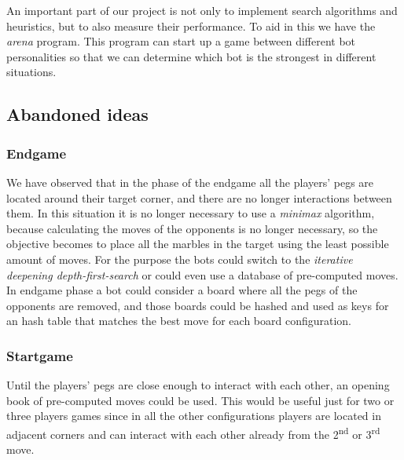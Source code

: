 \documentclass[a4paper,11pt]{article}
\begin{document}
An important part of our project is not only to implement search
algorithms and heuristics, but to also measure their performance. To
aid in this we have the \emph{arena} program. This program can start
up a game between different bot personalities so that we can determine
which bot is the strongest in different situations.



\subsection{Abandoned ideas}

\subsubsection{Endgame}
We have observed that in the phase of the endgame all the players' pegs are
located around their target corner, and there are no longer interactions between
them.
In this situation it is no longer necessary to use a \emph{minimax} algorithm,
because calculating the moves of the opponents is no longer necessary, so the
objective becomes to place all the marbles in the target using the least
possible amount of moves.
For the purpose the bots could switch to the \emph{iterative deepening
depth-first-search} or could even use a database of pre-computed moves.
In endgame phase a bot could consider a board where all the pegs of the
opponents are removed, and those boards could be hashed and used as keys for an
hash table that matches the best move for each board configuration.

\subsubsection{Startgame}
Until the players' pegs are close enough to interact with each other, an opening
book of pre-computed moves could be used. This would be useful just for two or
three players games since in all the other configurations players are located in
adjacent corners and can interact with each other already from the
 2\textsuperscript{nd} or 3\textsuperscript{rd} move.
\end{document}
